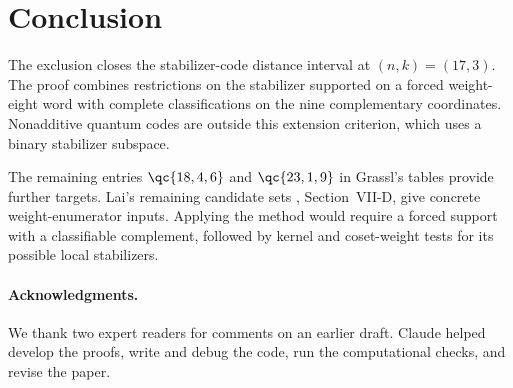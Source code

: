 \section{Conclusion}\label{sec:conclusion}

The exclusion closes the stabilizer-code distance interval at
\((n,k)=(17,3)\). The proof combines restrictions on the stabilizer
supported on a forced weight-eight word with complete classifications on
the nine complementary coordinates. Nonadditive quantum codes are
outside this extension criterion, which uses a binary stabilizer
subspace.

The remaining entries \(\qc{18,4,6}\) and \(\qc{23,1,9}\) in
Grassl's tables \cite{grassl} provide further targets. Lai's remaining
candidate sets \cite{lai}, Section~VII-D, give concrete weight-enumerator
inputs. Applying the method would require a forced support with a
classifiable complement, followed by kernel and coset-weight tests for
its possible local stabilizers.

\noindent\begin{minipage}{\linewidth}
\paragraph{Acknowledgments.}
We thank two expert readers for comments on an earlier draft.
Claude helped develop the proofs, write and debug the code, run the
computational checks, and revise the paper.
\end{minipage}
